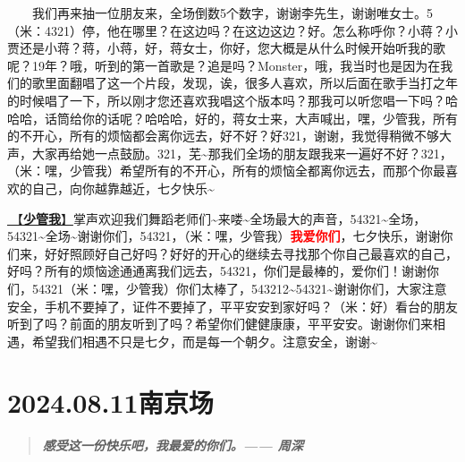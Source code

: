 \documentclass[]{ctexbook}
\begin{document}
  我们再来抽一位朋友来，全场倒数5个数字，谢谢李先生，谢谢唯女士。5（米：4321）停，他在哪里？在这边吗？在这边这边？好。怎么称呼你？小蒋？小贾还是小蒋？蒋，小蒋，好，蒋女士，你好，您大概是从什么时候开始听我的歌呢？19年？哦，听到的第一首歌是？追是吗？Monster，哦，我当时也是因为在我们的歌里面翻唱了这一个片段，发现，诶，很多人喜欢，所以后面在歌手当打之年的时候唱了一下，所以刚才您还喜欢我唱这个版本吗？那我可以听您唱一下吗？哈哈哈，话筒给你的话呢？哈哈哈，好的，蒋女士来，大声喊出，嘿，少管我，所有的不开心，所有的烦恼都会离你远去，好不好？好321，谢谢，我觉得稍微不够大声，大家再给她一点鼓励。321，芜\textasciitilde 那我们全场的朋友跟我来一遍好不好？321，（米：嘿，少管我）希望所有的不开心，所有的烦恼全都离你远去，而那个你最喜欢的自己，向你越靠越近，七夕快乐\textasciitilde{}

\hyperref[watch-ur-manners]{🎵【\textbf{少管我}】}掌声欢迎我们舞蹈老师们\textasciitilde 来喽\textasciitilde 全场最大的声音，54321\textasciitilde 全场，54321\textasciitilde 全场\textasciitilde 谢谢你们，54321，（米：嘿，少管我）\textbf{\textcolor{red}{我爱你们}}，七夕快乐，谢谢你们来，好好照顾好自己好吗？好好的开心的继续去寻找那个你自己最喜欢的自己，好吗？所有的烦恼途通通离我们远去，54321，你们是最棒的，爱你们！谢谢你们，54321（米：嘿，少管我）你们太棒了，543212\textasciitilde54321\textasciitilde 谢谢你们，大家注意安全，手机不要掉了，证件不要掉了，平平安安到家好吗？（米：好）看台的朋友听到了吗？前面的朋友听到了吗？希望你们健健康康，平平安安。谢谢你们来相遇，希望我们相遇不只是七夕，而是每一个朝夕。注意安全，谢谢\textasciitilde{}

\chapter{2024.08.11南京场}\label{nanjing-20240811}

\begin{quote}
\textbf{\emph{感受这一份快乐吧，我最爱的你们。------ 周深}}
\end{quote}
\end{document}
